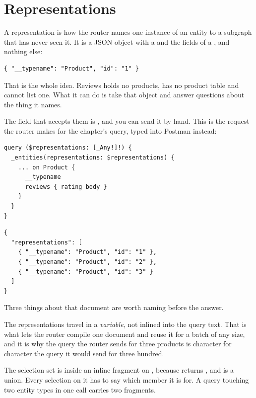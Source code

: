 \section{Representations}
\label{sec:ch07-representations}
%

A representation is how the router names one instance of an entity to a subgraph
that has never seen it. It is a JSON object with a  and the
fields of a , and nothing else:

\begin{verbatim}
{ "__typename": "Product", "id": "1" }
\end{verbatim}

That is the whole idea. Reviews holds no products, has no product table and
cannot list one. What it can do is take that object and answer questions about
the thing it names.

%
The field that accepts them is , and you can send it by hand.
This is the request the router makes for the chapter's query, typed into Postman
instead:

\begin{verbatim}
query ($representations: [_Any!]!) {
  _entities(representations: $representations) {
    ... on Product {
      __typename
      reviews { rating body }
    }
  }
}
\end{verbatim}

\begin{verbatim}
{
  "representations": [
    { "__typename": "Product", "id": "1" },
    { "__typename": "Product", "id": "2" },
    { "__typename": "Product", "id": "3" }
  ]
}
\end{verbatim}

Three things about that document are worth naming before the answer.

%
The representations travel in a \emph{variable}, not inlined into the query
text. That is what lets the router compile one document and reuse it for a batch
of any size, and it is why the query the router sends for three products is
character for character the query it would send for three hundred.

The selection set is inside an inline fragment on , because
 returns \code{[\_Entity]}, and  is a union. Every
selection on it has to say which member it is for. A query touching two entity
types in one call carries two fragments.

